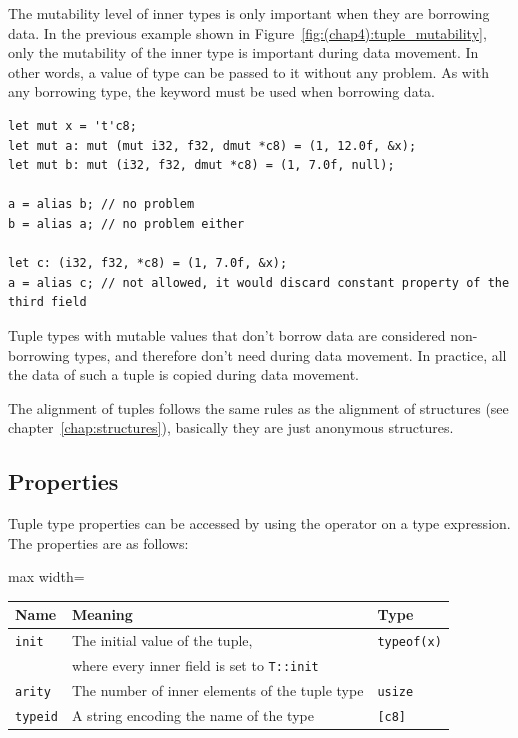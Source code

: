 

The mutability level of inner types is only important when they are borrowing
data. In the previous example shown in Figure~\ref{fig:(chap4):tuple_mutability}, only
the mutability of the inner type  is important during data movement.
In other words, a value of type  can be passed
to it without any problem. As with any borrowing type, the keyword
 must be used when borrowing data.

\begin{lstlisting}[style=coloredverbatimError]
let mut x = 't'c8;
let mut a: mut (mut i32, f32, dmut *c8) = (1, 12.0f, &x);
let mut b: mut (i32, f32, dmut *c8) = (1, 7.0f, null);

a = alias b; // no problem
b = alias a; // no problem either

let c: (i32, f32, *c8) = (1, 7.0f, &x);
a = alias c; // not allowed, it would discard constant property of the third field
\end{lstlisting}

Tuple types with mutable values that don't borrow data are considered
non-borrowing types, and therefore don't need  during data
movement. In practice, all the data of such a tuple is copied during data
movement.

The alignment of tuples follows the same rules as the alignment of structures
(see chapter~\ref{chap:structures}), basically they are just anonymous
structures.

\subsection {Properties}

Tuple type properties can be accessed by using the \token{::} operator on a
type expression. The properties are as follows:
\smallskip

\begin{center}
  \begin{adjustbox}{max width=\linewidth}
    \begin{tabular}{|l|ll|}
      \hline
      Name & Meaning & Type\\
      \hline
      \hline
      \texttt{init} & The initial value of the tuple, & \texttt{typeof(x)} \\
      & where every inner field is set to \texttt{T::init} & \\
      \Xhline{0.001pt}
      \texttt{arity} & The number of inner elements of the tuple type & \texttt{usize}\\
      \hline
      \texttt{typeid} & A string encoding the name of the type & \texttt{[c8]} \\
      \hline
    \end{tabular}
  \end{adjustbox}
\end{center}

